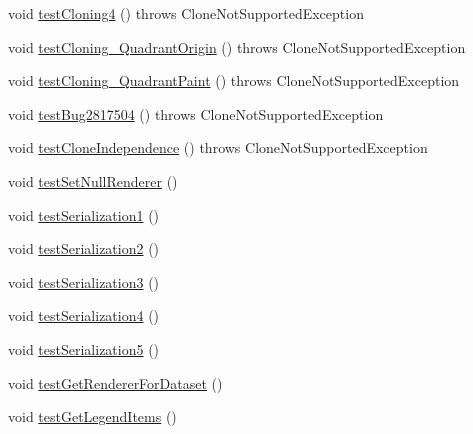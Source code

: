 \begin{DoxyCompactItemize}
\item 
void \mbox{\hyperlink{classorg_1_1jfree_1_1chart_1_1plot_1_1_x_y_plot_test_a33e0c630202218a6f1d290bd419cfe8d}{test\+Cloning4}} ()  throws Clone\+Not\+Supported\+Exception 
\item 
void \mbox{\hyperlink{classorg_1_1jfree_1_1chart_1_1plot_1_1_x_y_plot_test_a96662a09b7bae217e8fa873ec530c83b}{test\+Cloning\+\_\+\+Quadrant\+Origin}} ()  throws Clone\+Not\+Supported\+Exception 
\item 
void \mbox{\hyperlink{classorg_1_1jfree_1_1chart_1_1plot_1_1_x_y_plot_test_ae1f88b079a86db4fbecfecb0feb838a1}{test\+Cloning\+\_\+\+Quadrant\+Paint}} ()  throws Clone\+Not\+Supported\+Exception 
\item 
void \mbox{\hyperlink{classorg_1_1jfree_1_1chart_1_1plot_1_1_x_y_plot_test_aeda6153bf952d7b4d5187655e6a5ed7e}{test\+Bug2817504}} ()  throws Clone\+Not\+Supported\+Exception 
\item 
void \mbox{\hyperlink{classorg_1_1jfree_1_1chart_1_1plot_1_1_x_y_plot_test_a907736b42c9ae035daa01914a658226c}{test\+Clone\+Independence}} ()  throws Clone\+Not\+Supported\+Exception 
\item 
void \mbox{\hyperlink{classorg_1_1jfree_1_1chart_1_1plot_1_1_x_y_plot_test_a16ea90acb1d498a20a2005be1919cc65}{test\+Set\+Null\+Renderer}} ()
\item 
void \mbox{\hyperlink{classorg_1_1jfree_1_1chart_1_1plot_1_1_x_y_plot_test_ab3b42dc80a7d5085b7d8ba3c379efb7b}{test\+Serialization1}} ()
\item 
void \mbox{\hyperlink{classorg_1_1jfree_1_1chart_1_1plot_1_1_x_y_plot_test_a359d5a2f20ce33b348d640a85ff60eca}{test\+Serialization2}} ()
\item 
void \mbox{\hyperlink{classorg_1_1jfree_1_1chart_1_1plot_1_1_x_y_plot_test_ad49f8ebd1596309960ec4b6897001c47}{test\+Serialization3}} ()
\item 
void \mbox{\hyperlink{classorg_1_1jfree_1_1chart_1_1plot_1_1_x_y_plot_test_a745fcea1d71c2539ae40835bf969dbc1}{test\+Serialization4}} ()
\item 
void \mbox{\hyperlink{classorg_1_1jfree_1_1chart_1_1plot_1_1_x_y_plot_test_a343a13fa716773a6532250a2f6680358}{test\+Serialization5}} ()
\item 
void \mbox{\hyperlink{classorg_1_1jfree_1_1chart_1_1plot_1_1_x_y_plot_test_a05a1aed7b1ac5dae1d1860c364a07cae}{test\+Get\+Renderer\+For\+Dataset}} ()
\item 
void \mbox{\hyperlink{classorg_1_1jfree_1_1chart_1_1plot_1_1_x_y_plot_test_a17ae928dfbe3e3fe70bc8112130eebc1}{test\+Get\+Legend\+Items}} ()

\end{DoxyCompactItemize}

